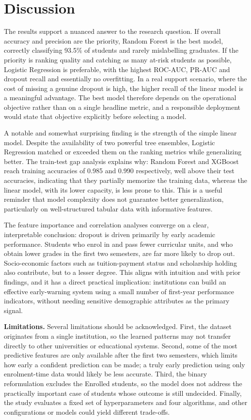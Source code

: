 \documentclass[conference]{IEEEtran}
\begin{document}
	\section{Discussion}
	\label{sec:discussion}
	
	The results support a nuanced answer to the research question. If overall accuracy and precision are the priority, Random Forest is the best model, correctly classifying 93.5\% of students and rarely mislabelling graduates. If the priority is ranking quality and catching as many at-risk students as possible, Logistic Regression is preferable, with the highest ROC-AUC, PR-AUC and dropout recall and essentially no overfitting. In a real support scenario, where the cost of missing a genuine dropout is high, the higher recall of the linear model is a meaningful advantage. The best model therefore depends on the operational objective rather than on a single headline metric, and a responsible deployment would state that objective explicitly before selecting a model.
	
	A notable and somewhat surprising finding is the strength of the simple linear model. Despite the availability of two powerful tree ensembles, Logistic Regression matched or exceeded them on the ranking metrics while generalizing better. The train-test gap analysis explains why: Random Forest and XGBoost reach training accuracies of 0.985 and 0.990 respectively, well above their test accuracies, indicating that they partially memorize the training data, whereas the linear model, with its lower capacity, is less prone to this. This is a useful reminder that model complexity does not guarantee better generalization, particularly on well-structured tabular data with informative features.
	
	The feature importance and correlation analyses converge on a clear, interpretable conclusion: dropout is driven primarily by early academic performance. Students who enrol in and pass fewer curricular units, and who obtain lower grades in the first two semesters, are far more likely to drop out. Socio-economic factors such as tuition-payment status and scholarship holding also contribute, but to a lesser degree. This aligns with intuition and with prior findings, and it has a direct practical implication: institutions can build an effective early-warning system using a small number of first-year performance indicators, without needing sensitive demographic attributes as the primary signal.
	
	\textbf{Limitations.} Several limitations should be acknowledged. First, the dataset originates from a single institution, so the learned patterns may not transfer directly to other universities or educational systems. Second, some of the most predictive features are only available after the first two semesters, which limits how early a confident prediction can be made; a truly early prediction using only enrolment-time data would likely be less accurate. Third, the binary reformulation excludes the Enrolled students, so the model does not address the practically important case of students whose outcome is still undecided. Finally, the study evaluates a fixed set of hyperparameters and four algorithms, and other configurations or models could yield different trade-offs.
	
\end{document}
